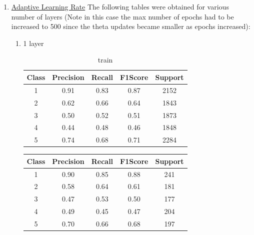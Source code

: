 \begin{enumerate}[label=(\alph*)]
    \item \underline{Adaptive Learning Rate} The following tables were obtained for various number of layers (Note in this case the max number of epochs had to be increased to 500 since the theta updates became smaller as epochs increased):
          \begin{enumerate}[label=\roman*.]
              \item 1 layer
                    \begin{table}[!htb]
                        \centering
                        \begin{tabular}{ccccc}
                            \hline
                            Class & Precision & Recall & F1Score & Support \\ \hline
                            1     & 0.91      & 0.83   & 0.87    & 2152    \\
                            2     & 0.62      & 0.66   & 0.64    & 1843    \\
                            3     & 0.50      & 0.52   & 0.51    & 1873    \\
                            4     & 0.44      & 0.48   & 0.46    & 1848    \\
                            5     & 0.74      & 0.68   & 0.71    & 2284    \\ \hline
                        \end{tabular}
                        \caption{train}
                        \label{part d train depth 1}
                    \end{table}
                    \begin{table}[!htb]
                        \centering
                        \begin{tabular}{ccccc}
                            \hline
                            Class & Precision & Recall & F1Score & Support \\ \hline
                            1     & 0.90      & 0.85   & 0.88    & 241     \\
                            2     & 0.58      & 0.64   & 0.61    & 181     \\
                            3     & 0.47      & 0.53   & 0.50    & 177     \\
                            4     & 0.49      & 0.45   & 0.47    & 204     \\
                            5     & 0.70      & 0.66   & 0.68    & 197     \\ \hline

\end{tabular}
\end{table}
\end{enumerate}
\end{enumerate}
